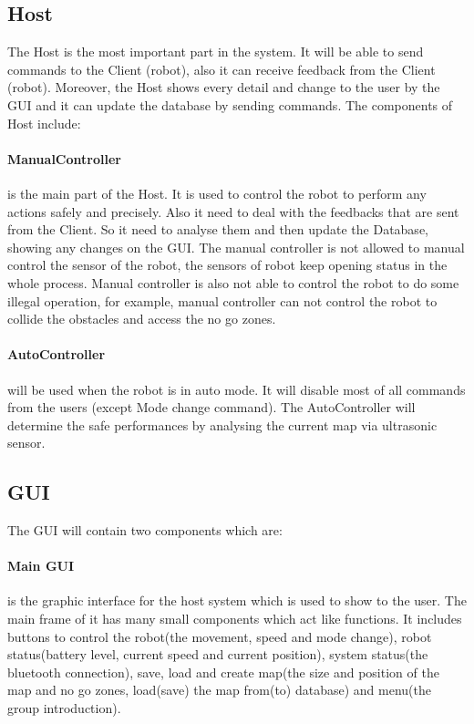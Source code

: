 \documentclass[11pt, a4paper]{report}
\begin{document}
\subsection{Host} The Host is the most important part in the system. It will be able to send commands to the Client (robot), also it can receive feedback from the Client (robot). Moreover, the Host shows every detail and change to the user by the GUI and it can update the database by sending commands. The components of Host include:
\paragraph{ManualController} is the main part of the Host. It is used to control the robot to perform 
any actions safely and precisely. Also it need to deal with the feedbacks that are sent from the Client.
So it need to analyse them and then update the Database, showing any changes on the GUI. The manual controller is not allowed to manual control the sensor of the robot, the sensors of robot keep opening status in the whole process. Manual controller is also not able to control the robot to do some illegal operation, for example, manual controller can not control the robot to collide the obstacles and access the no go zones. 
\paragraph{AutoController} will be used when the robot is in auto mode. It will disable most of all commands from the users (except Mode change command). The AutoController will determine the safe performances by analysing the current map via ultrasonic sensor. 
\subsection{GUI} The GUI  will contain two components which are:
\paragraph{Main GUI} is the graphic interface for the host system which is used to show to the user.
 The main frame of it has many small components which act like functions.
 It includes buttons to control the robot(the movement, speed and mode change), robot status(battery level, current speed and current position), system status(the bluetooth connection), save, load and create map(the size and position of the map and no go zones, load(save) the map from(to) database) and menu(the group introduction).
\end{document}
